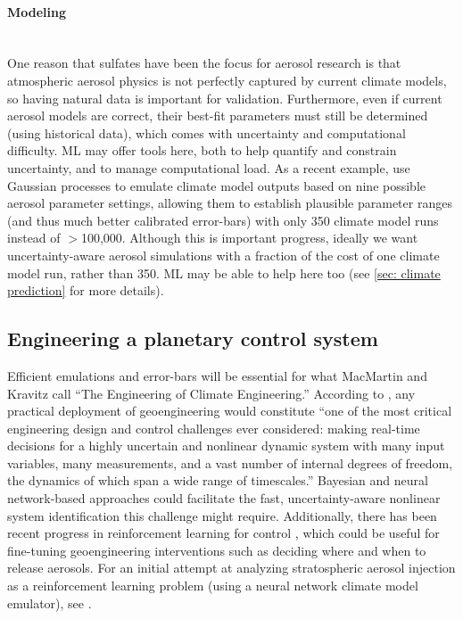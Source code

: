 \documentclass[11pt]{report}
\newcommand{\Gap}{\texorpdfstring{\hfill}{}}
\newcommand{\Rec}{\texorpdfstring{{\small\emph{\color{blue}{\fbox{High Leverage}}}}}{}}
\newcommand{\HighRisk}{\texorpdfstring{{\small\emph{\color{orange}{\fbox{Uncertain Impact}}}}}{}}
\newcommand{\Longterm}{\texorpdfstring{{\small\emph{\color{OliveGreen}{\fbox{Long-term}}}}}{}}
\begin{document}
\paragraph*{Modeling}\Gap\mbox{}\\
One reason that sulfates have been the focus for aerosol research is that atmospheric aerosol physics is not perfectly captured by current climate models, so having natural data is important for validation. Furthermore, even if current aerosol models are correct, their best-fit parameters must still be determined (using historical data), which comes with uncertainty and computational difficulty. ML may offer tools here, both to help quantify and constrain uncertainty, and to manage computational load. As a recent example, \cite{fletcher2018quantifying} use Gaussian processes to emulate climate model outputs based on nine possible aerosol parameter settings, allowing them to establish plausible parameter ranges (and thus much better calibrated error-bars) with only 350 climate model runs instead of $>$100,000. Although this is important progress, ideally we want uncertainty-aware aerosol simulations with a fraction of the cost of one climate model run, rather than 350. ML may be able to help here too (see \textsection\ref{sec: climate prediction} for more details).

\subsection{Engineering a planetary control system\Gap \Rec \Longterm \HighRisk}
\label{subsub:planetary-control}
Efficient emulations and error-bars will be essential for what MacMartin and Kravitz \cite{macmartin2018engineering} call ``The Engineering of Climate Engineering.'' According to \cite{macmartin2018engineering}, any practical deployment of geoengineering would constitute ``one of the most critical engineering design and control challenges ever considered: making real-time decisions for a highly uncertain and nonlinear dynamic system with many input variables, many measurements, and a vast number of internal degrees of freedom, the dynamics of which span a wide range of timescales.'' Bayesian and neural network-based approaches could facilitate the fast, uncertainty-aware nonlinear system identification this challenge might require. Additionally, there has been recent progress in reinforcement learning for control \cite{moe2018machine,boczar2018finite,amos2018differentiable}, which could be useful for fine-tuning geoengineering interventions such as deciding where and when to release aerosols. For an initial attempt at analyzing stratospheric aerosol injection as a reinforcement learning problem (using a neural network climate model emulator), see \cite{de2019stratospheric}.
\end{document}
